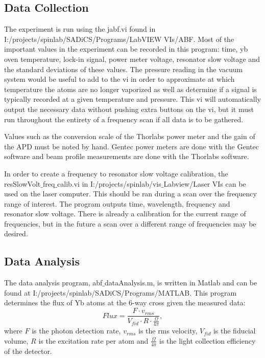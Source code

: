 \documentclass[12pt, a4paper]{article}
\begin{document}
\subsection{Data Collection}
The experiment is run using the jabf.vi found in I:/projects/spinlab/SADiCS/Programs/LabVIEW VIs/ABF. Most of the important values in the experiment can be recorded in this program: time, yb oven temperature, lock-in signal, power meter voltage, resonator slow voltage and the standard deviations of these values. The pressure reading in the vacuum system would be useful to add to the vi in order to approximate at which temperature the atoms are no longer vaporized as well as determine if a signal is typically recorded at a given temperature and pressure. This vi will automatically output the necessary data without pushing extra buttons on the vi, but it must run throughout the entirety of a frequency scan if all data is to be gathered. 

Values such as the conversion scale of the Thorlabs power meter and the gain of the APD must be noted by hand. Gentec power meters are done with the Gentec software and beam profile measurements are done with the Thorlabs software.

In order to create a frequency to resonator slow voltage calibration, the resSlowVolt$\_$freq$\_$calib.vi in I:/projects/spinlab/vis$\_$Labview/Laser VIs can be used on the laser computer. This should be ran during a scan over the frequency range of interest. The program outputs time, wavelength, frequency and resonator slow voltage. There is already a calibration for the current range of frequencies, but in the future a scan over a different range of frequencies may be desired.

\subsection{Data Analysis}
The data analysis program, abf$\_$dataAnalysis.m,  is written in Matlab and can be found at I:/projects/spinlab/SADiCS/Programs/MATLAB. This program determines the flux of Yb atoms at the 6-way cross given the measured data:
\begin{equation}
Flux = \frac{F \cdot v_{rms}}{V_{fid}\cdot R \cdot \frac{\Omega}{4\pi} },
\end{equation}
where $F$ is the photon detection rate, $v_{rms}$ is the rms velocity, $V_{fid}$ is the fiducial volume, $R$ is the excitation rate per atom and $\frac{\Omega}{4 \pi}$ is the light collection efficiency of the detector. 
\end{document}
